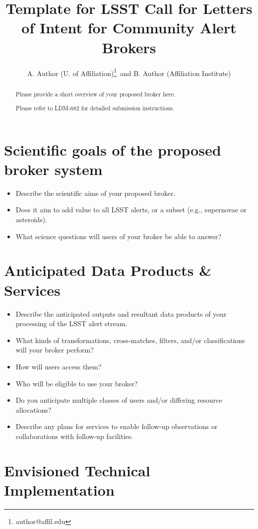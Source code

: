 \documentclass[11pt, letterpaper]{article}
\title{Template for LSST Call for Letters of Intent for Community Alert Brokers}
\author{A. Author (U. of Affiliation)\footnote{author@affil.edu}\ and B. Author (Affiliation Institute)}
\date{}
\begin{document}
\maketitle

\begin{abstract}
Please provide a short overview of your proposed broker here.

Please refer to LDM-682 for detailed submission instructions.
\end{abstract}


\section{Scientific goals of the proposed broker system}

\begin{itemize}
\item Describe the scientific aims of your proposed broker. 
\item Does it aim to add value to all LSST alerts, or a subset (e.g., supernovae or asteroids).
\item What science questions will users of your broker be able to answer?
\end{itemize}


\section{Anticipated Data Products \& Services}

\begin{itemize}
\item Describe the anticipated outputs and resultant data products of your processing of the LSST alert stream. 
\item What kinds of transformations, cross-matches, filters, and/or classifications will your broker perform?
\item How will users access them?
\item Who will be eligible to use your broker?
\item Do you anticipate multiple classes of users and/or differing resource allocations?
\item Describe any plans for services to enable follow-up observations or collaborations with follow-up facilities.
\end{itemize}



\section{Envisioned Technical Implementation}
\end{document}
